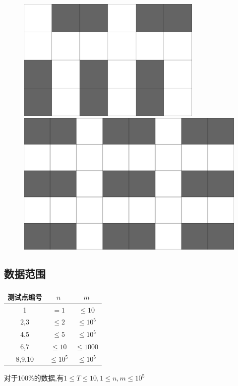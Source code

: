 \documentclass[12pt]{ctexart}
\begin{document}
\begin{figure}[htbp]
	\centering
	\begin{minipage}[t]{0.49\textwidth}
		\centering
		\includegraphics[width=0.8\textwidth]{pictures/2-4.png}
		\caption{}
	\end{minipage}
	\begin{minipage}[t]{0.49\textwidth}
		\centering
		\includegraphics[width=\textwidth]{pictures/2-5.png}
		\caption{}
	\end{minipage}
\end{figure}


\subsection{数据范围}
\begin{center}
	\begin{tabular}{|c|c|c|}
		\hline 测试点编号&$n$&$m$\\
		\hline 1&$=1$&$\le10$\\
		\hline 2,3&$\le2$&$\le10^5$\\
		\hline 4,5&$\le5$&$\le10^5$\\
		\hline 6,7&$\le10$&$\le1000$\\
		\hline 8,9,10&$\le10^5$&$\le10^5$\\
		\hline
	\end{tabular}
\end{center}
对于100\%的数据,有$1\le T\le10,1\le n,m\le10^5$
\newpage
\end{document}
